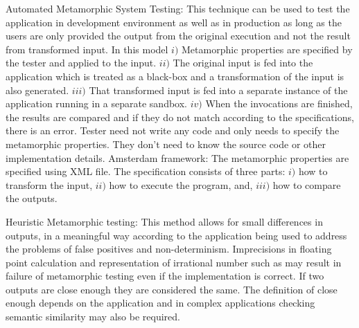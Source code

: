 		Automated Metamorphic System Testing: This technique can be used to test the application in development environment as well as in production as long as the users are only provided the output from the original execution and not the result from transformed input. In this model $i)$ Metamorphic properties are specified by the tester and applied to the input. $ii)$ The original input is fed into the application which is treated as a black-box and a transformation of the input is also generated. $iii)$ That transformed input is fed into a separate instance of the application running in a separate sandbox. $iv)$ When the invocations are finished, the results are compared and if they do not match according to the specifications, there is an error.
		Tester need not write any code and only needs to specify the metamorphic properties. They don’t need to know the source code or other implementation details.
		Amsterdam framework: The metamorphic properties are specified using XML file. The specification consists of three parts: $i)$ how to transform the input, $ii)$ how to execute the program, and, $iii)$ how to compare the outputs.\par
		Heuristic Metamorphic testing: This method allows for small differences in outputs, in a meaningful way according to the application being used to address the problems of false positives and non-determinism. Imprecisions in floating point calculation and representation of irrational number such as may result in failure of metamorphic testing even if the implementation is correct. If two outputs are close enough they are considered the same. The definition of close enough depends on the application and in complex applications checking semantic similarity may also be required.
